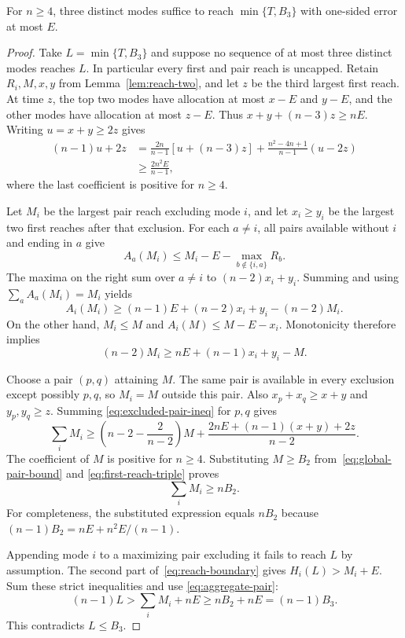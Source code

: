 \begin{theorem}\label{thm:reach-three}
For $n\ge4$, three distinct modes suffice to reach $\min\{T,B_3\}$
with one-sided error at most $E$.
\end{theorem}
\begin{proof}
Take $L=\min\{T,B_3\}$ and suppose no sequence of at most three
distinct modes reaches $L$. In particular every first and pair reach is
uncapped. Retain $R_i,M,x,y$ from Lemma~\ref{lem:reach-two}, and let
$z$ be the third largest first reach. At time $z$, the top two modes
have allocation at most $x-E$ and $y-E$, and the other modes have
allocation at most $z-E$. Thus $x+y+(n-3)z\ge nE$.
Writing $u=x+y\ge2z$ gives
\begin{equation}\label{eq:first-reach-triple}
 \begin{split}
 (n-1)u+2z
 &=\frac{2n}{n-1}[u+(n-3)z]
 +\frac{n^2-4n+1}{n-1}(u-2z)\\
 &\ge\frac{2n^2E}{n-1},
 \end{split}
\end{equation}
where the last coefficient is positive for $n\ge4$.

Let $M_i$ be the largest pair reach excluding mode $i$, and let
$x_i\ge y_i$ be the largest two first reaches after that exclusion.
For each $a\ne i$, all pairs available without $i$ and ending in $a$
give
\[
 A_a(M_i)\le M_i-E-\max_{b\notin\{i,a\}}R_b.
\]
The maxima on the right sum over $a\ne i$ to $(n-2)x_i+y_i$.
Summing and using $\sum_a A_a(M_i)=M_i$ yields
\[
 A_i(M_i)\ge(n-1)E+(n-2)x_i+y_i-(n-2)M_i.
\]
On the other hand, $M_i\le M$ and
$A_i(M)\le M-E-x_i$. Monotonicity therefore implies
\begin{equation}\label{eq:excluded-pair-ineq}
 (n-2)M_i\ge nE+(n-1)x_i+y_i-M.
\end{equation}

Choose a pair $(p,q)$ attaining $M$. The same pair is available in every
exclusion except possibly $p,q$, so $M_i=M$ outside this pair. Also
$x_p+x_q\ge x+y$ and $y_p,y_q\ge z$. Summing
\eqref{eq:excluded-pair-ineq} for $p,q$ gives
\[
 \sum_i M_i\ge
 \left(n-2-\frac2{n-2}\right)M
 +\frac{2nE+(n-1)(x+y)+2z}{n-2}.
\]
The coefficient of $M$ is positive for $n\ge4$. Substituting
$M\ge B_2$ from~\eqref{eq:global-pair-bound} and
\eqref{eq:first-reach-triple} proves
\begin{equation}\label{eq:aggregate-pair}
 \sum_iM_i\ge nB_2.
\end{equation}
For completeness, the substituted expression equals $nB_2$ because
$(n-1)B_2=nE+n^2E/(n-1)$.

Appending mode $i$ to a maximizing pair excluding it fails to reach $L$
by assumption. The second part of~\eqref{eq:reach-boundary} gives
$H_i(L)>M_i+E$. Sum these strict inequalities and use
\eqref{eq:aggregate-pair}:
\[
 (n-1)L>\sum_iM_i+nE\ge nB_2+nE=(n-1)B_3.
\]
This contradicts $L\le B_3$.
\end{proof}

